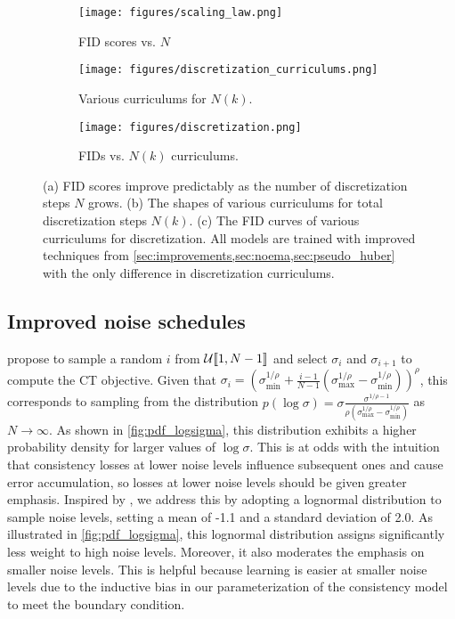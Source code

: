 \begin{figure}
    \centering
    \begin{subfigure}[b]{0.345\textwidth}
        \centering
        \texttt{[image: figures/scaling\_law.png]}
        \caption{FID scores vs. $N$}\label{fig:scaling_law}
    \end{subfigure}%
    \begin{subfigure}[b]{0.337\textwidth}
        \centering
        \texttt{[image: figures/discretization\_curriculums.png]}
        \caption{Various curriculums for $N(k)$.}\label{fig:curriculum_shape}
    \end{subfigure}%
    \begin{subfigure}[b]{0.33\textwidth}
        \centering
        \texttt{[image: figures/discretization.png]}
        \caption{FIDs vs. $N(k)$ curriculums.}\label{fig:curriculums}
    \end{subfigure}
    \caption{(a) FID scores improve predictably as the number of discretization steps $N$ grows. (b) The shapes of various curriculums for total discretization steps $N(k)$. (c) The FID curves of various curriculums for discretization. All models are trained with improved techniques from \cref{sec:improvements,sec:noema,sec:pseudo_huber} with the only difference in discretization curriculums.}\label{fig:discretization}
\end{figure}

\subsection{Improved noise schedules}\label{sec:noise}


\citet{song2023consistency} propose to sample a random $i$ from $\mathcal{U}\llbracket 1, N-1 \rrbracket$ and select $\sigma_i$ and $\sigma_{i+1}$ to compute the CT objective. Given that $\sigma_i = (\sigma_\text{min}^{1/\rho} + \frac{i-1}{N-1}(\sigma_\text{max}^{1/\rho} - \sigma_\text{min}^{1/\rho}))^\rho$, this corresponds to sampling from the distribution $p(\log \sigma) = \sigma \frac{\sigma^{1/\rho - 1}}{\rho (\sigma_\text{max}^{1/\rho} - \sigma_\text{min}^{1/\rho})}$ as $N \to \infty$. As shown in \cref{fig:pdf_logsigma}, this distribution exhibits a higher probability density for larger values of $\log \sigma$. This is at odds with the intuition that consistency losses at lower noise levels influence subsequent ones and cause error accumulation, so losses at lower noise levels should be given greater emphasis. Inspired by \citet{Karras2022edm}, we address this by adopting a lognormal distribution to sample noise levels, setting a mean of -1.1 and a standard deviation of 2.0. As illustrated in \cref{fig:pdf_logsigma}, this lognormal distribution assigns significantly less weight to high noise levels. Moreover, it also moderates the emphasis on smaller noise levels. This is helpful because learning is easier at smaller noise levels due to the inductive bias in our parameterization of the consistency model to meet the boundary condition.


